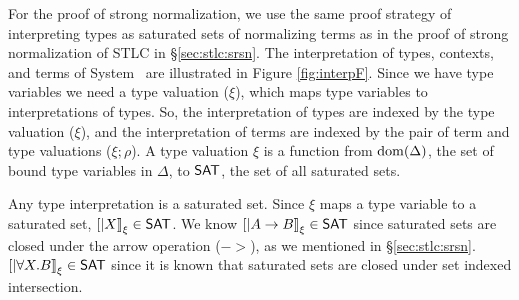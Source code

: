 For the proof of strong normalization, we use the same proof strategy of
interpreting types as saturated sets of normalizing terms as in the proof of
strong normalization of STLC in \S\ref{sec:stlc:srsn}. The interpretation of
types, contexts, and terms of System \F\ are illustrated in
Figure \ref{fig:interpF}. Since we have type variables we need a type valuation
($\xi$), which maps type variables to interpretations of types. So, the
interpretation of types are indexed by the type valuation ($\xi$), and
the interpretation of terms are indexed by the pair of term and type valuations
($\xi;\rho$). A type valuation $\xi$ is a function from $\mathop{\mathrm{dom}}(\Delta)$,
the set of bound type variables in $\Delta$, to $\mathsf{SAT}$, the set of all
saturated sets.

Any type interpretation is a saturated set. Since $\xi$ maps a type variable
to a saturated set, $[|X|]_\xi \in \mathsf{SAT}$. We know $[|A -> B|]_\xi \in \mathsf{SAT}$
since saturated sets are closed under the arrow operation ($->$), as we
mentioned in \S\ref{sec:stlc:srsn}. $[|\forall X.B|]_\xi \in \mathsf{SAT}$ since
it is known that saturated sets are closed under set indexed intersection.

